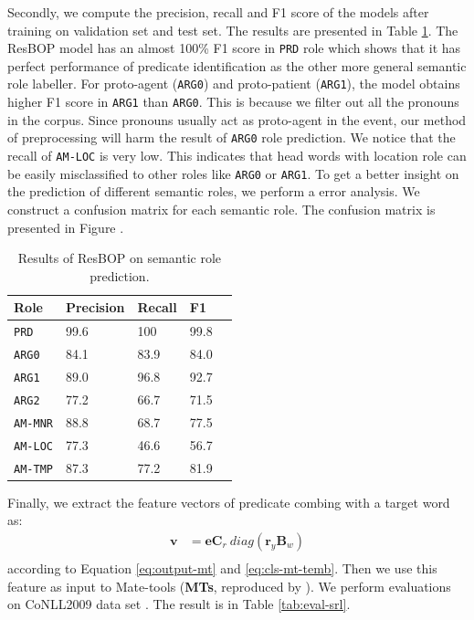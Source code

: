 \documentclass[a4paper]{article}
\begin{document}
Secondly, we compute the precision, recall and F1 score of the models after training on validation set and test set. The results are presented in Table \ref{tab:eval-role}. The ResBOP model has an almost 100\% F1 score in \texttt{PRD} role which shows that it has perfect performance of predicate identification as the other more general semantic role labeller. For proto-agent (\texttt{ARG0}) and proto-patient (\texttt{ARG1}), the model obtains higher F1 score in \texttt{ARG1} than \texttt{ARG0}. This is because we filter out all the pronouns in the corpus. Since pronouns usually act as proto-agent in the event, our method of preprocessing will harm the result of \texttt{ARG0} role prediction. We notice that the recall of \texttt{AM-LOC} is very low. This indicates that head words with location role can be easily misclassified to other roles like \texttt{ARG0} or \texttt{ARG1}. 
To get a better insight on the prediction of different semantic roles, we perform a error analysis. We construct a confusion matrix for each semantic role. The confusion matrix is presented in Figure .

\begin{table}[t]
\centering
\begin{tabular}{lllll}
\textbf{Role} &   Precision   &   Recall &   F1 \\ \hline
\texttt{PRD}    &   99.6 &   100     &   99.8 \\
\texttt{ARG0}   &   84.1 &   83.9      &   84.0 \\
\texttt{ARG1}   &   89.0 &   96.8      &   92.7 \\
\texttt{ARG2}   &   77.2 &   66.7      &   71.5 \\
\texttt{AM-MNR} &   88.8 &   68.7      &   77.5 \\
\texttt{AM-LOC} &   77.3 &   46.6      &   56.7 \\
\texttt{AM-TMP} &   87.3 &   77.2      &   81.9 \\
\end{tabular}
\caption{\label{tab:eval-role} Results of ResBOP on semantic role prediction.}
\end{table}

Finally, we extract the feature vectors of predicate combing with a target word as:
\begin{equation} \label{eq:rbe-bopres}
\begin{aligned}
    \mathbf{v}
        &= \mathbf{e} \mathbf{C}_r\ diag(\mathbf{r}_y \mathbf{B}_w) \\
\end{aligned}
\end{equation}
according to Equation \eqref{eq:output-mt} and \eqref{eq:cls-mt-temb}. Then we use this feature as input to Mate-tools (\textbf{MTs}, reproduced by \citet{bjorkelund2010high}). We perform evaluations on CoNLL2009 data set \citep{hajivc-EtAl:2009:CoNLL-2009-ST}. The result is in Table \ref{tab:eval-srl}. 
\end{document}
